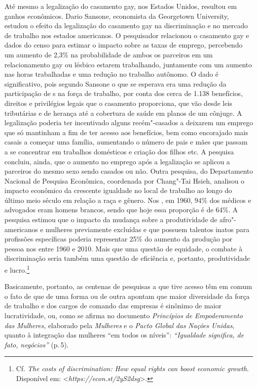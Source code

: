 Até mesmo a legalização do casamento gay, nos Estados Unidos, resultou
em ganhos econômicos. Dario Sansone, economista da Georgetown
University, estudou o efeito da legalização do casamento gay na
discriminação e no mercado de trabalho nos estados americanos. O
pesquisador relacionou o casamento gay e dados do censo para estimar o
impacto sobre as taxas de emprego, percebendo um aumento de 2,3\% na
probabilidade de ambos os parceiros em um relacionamento gay ou lésbico
estarem trabalhando, juntamente com um aumento nas horas trabalhadas e
uma redução no trabalho autônomo. O dado é significativo, pois segundo
Sansone o que se esperava era uma redução da participação de s na
força de trabalho, por conta dos cerca de 1.138 benefícios, direitos e
privilégios legais que o casamento proporciona, que vão desde leis
tributárias e de herança até a cobertura de saúde em planos de um
cônjuge. A legalização poderia ter incentivado alguns recém"-casados ​​a
deixarem um emprego que só mantinham a fim de ter acesso aos benefícios,
bem como encorajado mais casais a começar uma família, aumentando o
número de pais e mães que passam a se concentrar em trabalhos domésticos
e criação dos filhos etc. A pesquisa concluiu, ainda, que o aumento no
emprego após a legalização se aplicou a parceiros do mesmo sexo sendo
casados ​ou não. Outra pesquisa, do Departamento Nacional de Pesquisa
Econômica, coordenada por Chang"-Tai Hsieh, analisou o impacto econômico
da crescente igualdade no local de trabalho ao longo do último meio
século em relação a raça e gênero. Nos , em 1960, 94\% dos médicos e
advogados eram homens brancos, sendo que hoje essa proporção é de 64\%.
A pesquisa estimou que o impacto da mudança sobre a produtividade de
afro"-americanos e mulheres previamente excluídas e que possuem talentos
inatos para profissões específicas poderia representar 25\% do aumento
da produção por pessoa nos  entre 1960 e 2010. Mais que uma questão
de equidade, o combate à discriminação seria também uma questão de
eficiência e, portanto, produtividade e lucro.\footnote{Cf. \emph{The
  costs of discrimination: How equal rights can boost economic growth}.
  Disponível em: \textless{}\emph{https://econ.st/2yS2dsg}\textgreater{}.}

Basicamente, portanto, as centenas de pesquisas a que tive acesso têm em
comum o fato de que de uma forma ou de outra apontam que maior
diversidade da força de trabalho e dos cargos de comando das empresas é
sinônimo de maior lucratividade, ou, como se afirma no documento
\emph{Princípios de Empoderamento das Mulheres,} elaborado pela
\emph{ Mulheres} e o \emph{Pacto Global das Nações Unidas}, quanto à
integração das mulheres ``em todos os níveis'': \emph{``Igualdade
significa, de fato, negócios''} (p.\,5).

